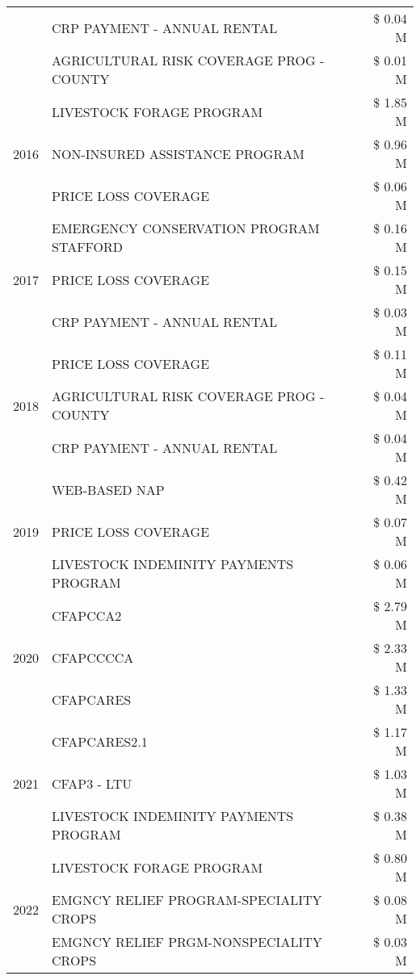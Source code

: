 \begin{tabular}{llr}
 & CRP PAYMENT - ANNUAL RENTAL & \$ 0.04 M \\
 & AGRICULTURAL RISK COVERAGE PROG - COUNTY & \$ 0.01 M \\
\cline{1-3}
\multirow[t]{3}{*}{2016} & LIVESTOCK FORAGE PROGRAM & \$ 1.85 M \\
 & NON-INSURED ASSISTANCE PROGRAM & \$ 0.96 M \\
 & PRICE LOSS COVERAGE & \$ 0.06 M \\
\cline{1-3}
\multirow[t]{3}{*}{2017} & EMERGENCY CONSERVATION PROGRAM STAFFORD & \$ 0.16 M \\
 & PRICE LOSS COVERAGE & \$ 0.15 M \\
 & CRP PAYMENT - ANNUAL RENTAL & \$ 0.03 M \\
\cline{1-3}
\multirow[t]{3}{*}{2018} & PRICE LOSS COVERAGE & \$ 0.11 M \\
 & AGRICULTURAL RISK COVERAGE PROG - COUNTY & \$ 0.04 M \\
 & CRP PAYMENT - ANNUAL RENTAL & \$ 0.04 M \\
\cline{1-3}
\multirow[t]{3}{*}{2019} & WEB-BASED NAP & \$ 0.42 M \\
 & PRICE LOSS COVERAGE & \$ 0.07 M \\
 & LIVESTOCK INDEMINITY PAYMENTS PROGRAM & \$ 0.06 M \\
\cline{1-3}
\multirow[t]{3}{*}{2020} & CFAPCCA2 & \$ 2.79 M \\
 & CFAPCCCCA & \$ 2.33 M \\
 & CFAPCARES & \$ 1.33 M \\
\cline{1-3}
\multirow[t]{3}{*}{2021} & CFAPCARES2.1 & \$ 1.17 M \\
 & CFAP3 - LTU & \$ 1.03 M \\
 & LIVESTOCK INDEMINITY PAYMENTS PROGRAM & \$ 0.38 M \\
\cline{1-3}
\multirow[t]{3}{*}{2022} & LIVESTOCK FORAGE PROGRAM & \$ 0.80 M \\
 & EMGNCY RELIEF PROGRAM-SPECIALITY CROPS & \$ 0.08 M \\
 & EMGNCY RELIEF PRGM-NONSPECIALITY CROPS & \$ 0.03 M \\
\cline{1-3}
\bottomrule
\end{tabular}
